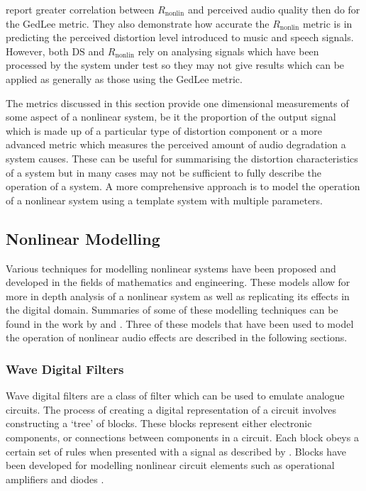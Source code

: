 			\citet{tan2004predicting} report greater correlation between $R_{\mathrm{nonlin}}$ and perceived
			audio quality then \citet{lee2003auditory} do for the GedLee metric. They also demonstrate how
			accurate the $R_{\mathrm{nonlin}}$ metric is in predicting the perceived distortion level
			introduced to music and speech signals. However, both $\mathrm{DS}$ and $R_{\mathrm{nonlin}}$ rely
			on analysing signals which have been processed by the system under test so they may not give
			results which can be applied as generally as those using the GedLee metric.

			The metrics discussed in this section provide one dimensional measurements of some aspect of a
			nonlinear system, be it the proportion of the output signal which is made up of a particular type
			of distortion component or a more advanced metric which measures the perceived amount of audio
			degradation a system causes. These can be useful for summarising the distortion characteristics of
			a system but in many cases may not be sufficient to fully describe the operation of a system. A
			more comprehensive approach is to model the operation of a nonlinear system using a template system
			with multiple parameters.

	\subsection{Nonlinear Modelling}
	\label{sec:Excitation-Analysis-Modelling}
		Various techniques for modelling nonlinear systems have been proposed and developed in the fields of
		mathematics and engineering. These models allow for more in depth analysis of a nonlinear system as well as
		replicating its effects in the digital domain. Summaries of some of these modelling techniques can be found
		in the work by \citet{janczak2005identification} and \citet{ogunfunmi2007adaptive}. Three of these models
		that have been used to model the operation of nonlinear audio effects are described in the following
		sections.



		\subsubsection{Wave Digital Filters}
			Wave digital filters are a class of filter which can be used to emulate analogue circuits. The
			process of creating a digital representation of a circuit involves constructing a `tree' of blocks.
			These blocks represent either electronic components, or connections between components in a
			circuit.  Each block obeys a certain set of rules when presented with a signal as described by
			\citet{fettweis1986wave}. Blocks have been developed for modelling nonlinear circuit elements such
			as operational amplifiers and diodes \citep{paiva2012emulation}.

